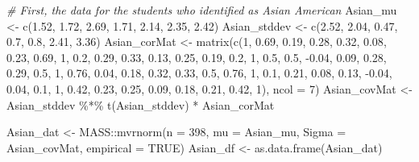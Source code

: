 \documentclass[
  11pt,
]{book}
\newenvironment{Shaded}{\begin{snugshade}}{\end{snugshade}}
\newcommand{\AttributeTok}[1]{\textcolor[rgb]{0.77,0.63,0.00}{#1}}
\newcommand{\CommentTok}[1]{\textcolor[rgb]{0.56,0.35,0.01}{\textit{#1}}}
\newcommand{\ConstantTok}[1]{\textcolor[rgb]{0.00,0.00,0.00}{#1}}
\newcommand{\DecValTok}[1]{\textcolor[rgb]{0.00,0.00,0.81}{#1}}
\newcommand{\FloatTok}[1]{\textcolor[rgb]{0.00,0.00,0.81}{#1}}
\newcommand{\FunctionTok}[1]{\textcolor[rgb]{0.00,0.00,0.00}{#1}}
\newcommand{\NormalTok}[1]{#1}
\newcommand{\OtherTok}[1]{\textcolor[rgb]{0.56,0.35,0.01}{#1}}
\newcommand{\SpecialCharTok}[1]{\textcolor[rgb]{0.00,0.00,0.00}{#1}}
\begin{document}
\begin{Shaded}
\begin{Highlighting}[]
\CommentTok{\# First, the data for the students who identified as Asian American}
\NormalTok{Asian\_mu }\OtherTok{\textless{}{-}} \FunctionTok{c}\NormalTok{(}\FloatTok{1.52}\NormalTok{, }\FloatTok{1.72}\NormalTok{, }\FloatTok{2.69}\NormalTok{, }\FloatTok{1.71}\NormalTok{, }\FloatTok{2.14}\NormalTok{, }\FloatTok{2.35}\NormalTok{, }\FloatTok{2.42}\NormalTok{)}
\NormalTok{Asian\_stddev }\OtherTok{\textless{}{-}} \FunctionTok{c}\NormalTok{(}\FloatTok{2.52}\NormalTok{, }\FloatTok{2.04}\NormalTok{, }\FloatTok{0.47}\NormalTok{, }\FloatTok{0.7}\NormalTok{, }\FloatTok{0.8}\NormalTok{, }\FloatTok{2.41}\NormalTok{, }\FloatTok{3.36}\NormalTok{)}
\NormalTok{Asian\_corMat }\OtherTok{\textless{}{-}} \FunctionTok{matrix}\NormalTok{(}\FunctionTok{c}\NormalTok{(}\DecValTok{1}\NormalTok{, }\FloatTok{0.69}\NormalTok{, }\FloatTok{0.19}\NormalTok{, }\FloatTok{0.28}\NormalTok{, }\FloatTok{0.32}\NormalTok{, }\FloatTok{0.08}\NormalTok{, }\FloatTok{0.23}\NormalTok{, }\FloatTok{0.69}\NormalTok{, }\DecValTok{1}\NormalTok{,}
    \FloatTok{0.2}\NormalTok{, }\FloatTok{0.29}\NormalTok{, }\FloatTok{0.33}\NormalTok{, }\FloatTok{0.13}\NormalTok{, }\FloatTok{0.25}\NormalTok{, }\FloatTok{0.19}\NormalTok{, }\FloatTok{0.2}\NormalTok{, }\DecValTok{1}\NormalTok{, }\FloatTok{0.5}\NormalTok{, }\FloatTok{0.5}\NormalTok{, }\SpecialCharTok{{-}}\FloatTok{0.04}\NormalTok{, }\FloatTok{0.09}\NormalTok{, }\FloatTok{0.28}\NormalTok{,}
    \FloatTok{0.29}\NormalTok{, }\FloatTok{0.5}\NormalTok{, }\DecValTok{1}\NormalTok{, }\FloatTok{0.76}\NormalTok{, }\FloatTok{0.04}\NormalTok{, }\FloatTok{0.18}\NormalTok{, }\FloatTok{0.32}\NormalTok{, }\FloatTok{0.33}\NormalTok{, }\FloatTok{0.5}\NormalTok{, }\FloatTok{0.76}\NormalTok{, }\DecValTok{1}\NormalTok{, }\FloatTok{0.1}\NormalTok{, }\FloatTok{0.21}\NormalTok{,}
    \FloatTok{0.08}\NormalTok{, }\FloatTok{0.13}\NormalTok{, }\SpecialCharTok{{-}}\FloatTok{0.04}\NormalTok{, }\FloatTok{0.04}\NormalTok{, }\FloatTok{0.1}\NormalTok{, }\DecValTok{1}\NormalTok{, }\FloatTok{0.42}\NormalTok{, }\FloatTok{0.23}\NormalTok{, }\FloatTok{0.25}\NormalTok{, }\FloatTok{0.09}\NormalTok{, }\FloatTok{0.18}\NormalTok{, }\FloatTok{0.21}\NormalTok{,}
    \FloatTok{0.42}\NormalTok{, }\DecValTok{1}\NormalTok{), }\AttributeTok{ncol =} \DecValTok{7}\NormalTok{)}
\NormalTok{Asian\_covMat }\OtherTok{\textless{}{-}}\NormalTok{ Asian\_stddev }\SpecialCharTok{\%*\%} \FunctionTok{t}\NormalTok{(Asian\_stddev) }\SpecialCharTok{*}\NormalTok{ Asian\_corMat}

\NormalTok{Asian\_dat }\OtherTok{\textless{}{-}}\NormalTok{ MASS}\SpecialCharTok{::}\FunctionTok{mvrnorm}\NormalTok{(}\AttributeTok{n =} \DecValTok{398}\NormalTok{, }\AttributeTok{mu =}\NormalTok{ Asian\_mu, }\AttributeTok{Sigma =}\NormalTok{ Asian\_covMat,}
    \AttributeTok{empirical =} \ConstantTok{TRUE}\NormalTok{)}
\NormalTok{Asian\_df }\OtherTok{\textless{}{-}} \FunctionTok{as.data.frame}\NormalTok{(Asian\_dat)}


\end{Highlighting}
\end{Shaded}
\end{document}
